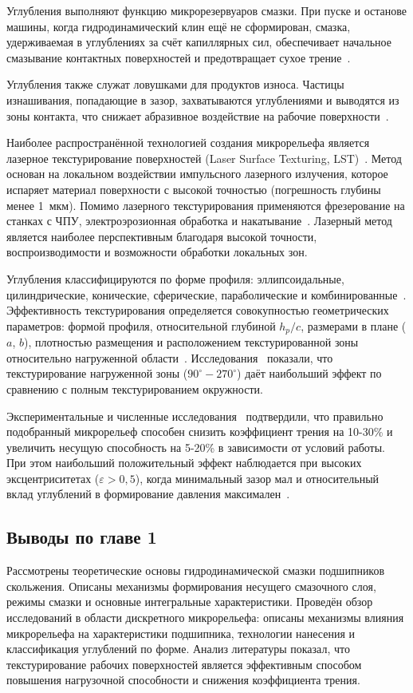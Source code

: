 Углубления выполняют функцию микрорезервуаров смазки. При пуске и останове машины, когда гидродинамический клин ещё не сформирован, смазка, удерживаемая в углублениях за счёт капиллярных сил, обеспечивает начальное смазывание контактных поверхностей и предотвращает сухое трение~\cite{galda2009}.

Углубления также служат ловушками для продуктов износа. Частицы изнашивания, попадающие в зазор, захватываются углублениями и выводятся из зоны контакта, что снижает абразивное воздействие на рабочие поверхности~\cite{etsion2005}.

Наиболее распространённой технологией создания микрорельефа является лазерное текстурирование поверхностей (Laser Surface Texturing, LST)~\cite{etsion2005}. Метод основан на локальном воздействии импульсного лазерного излучения, которое испаряет материал поверхности с высокой точностью (погрешность глубины менее 1~мкм). Помимо лазерного текстурирования применяются фрезерование на станках с ЧПУ, электроэрозионная обработка и накатывание~\cite{gropper2016}. Лазерный метод является наиболее перспективным благодаря высокой точности, воспроизводимости и возможности обработки локальных зон.

Углубления классифицируются по форме профиля: эллипсоидальные, цилиндрические, конические, сферические, параболические и комбинированные~\cite{gropper2016}. Эффективность текстурирования определяется совокупностью геометрических параметров: формой профиля, относительной глубиной $h_p/c$, размерами в плане ($a$, $b$), плотностью размещения и расположением текстурированной зоны относительно нагруженной области~\cite{tala2012, brizmer2003, rahmani2007}. Исследования~\cite{tala2012} показали, что текстурирование нагруженной зоны ($90^\circ - 270^\circ$) даёт наибольший эффект по сравнению с полным текстурированием окружности.

Экспериментальные и численные исследования~\cite{kligerman2005, zhang2016, wang2013} подтвердили, что правильно подобранный микрорельеф способен снизить коэффициент трения на 10-30\% и увеличить несущую способность на 5-20\% в зависимости от условий работы. При этом наибольший положительный эффект наблюдается при высоких эксцентриситетах ($\varepsilon > 0{,}5$), когда минимальный зазор мал и относительный вклад углублений в формирование давления максимален~\cite{dobrica2010}.

\subsection*{Выводы по главе 1}
{}

Рассмотрены теоретические основы гидродинамической смазки подшипников скольжения. Описаны механизмы формирования несущего смазочного слоя, режимы смазки и основные интегральные характеристики. Проведён обзор исследований в области дискретного микрорельефа: описаны механизмы влияния микрорельефа на характеристики подшипника, технологии нанесения и классификация углублений по форме. Анализ литературы показал, что текстурирование рабочих поверхностей является эффективным способом повышения нагрузочной способности и снижения коэффициента трения.
